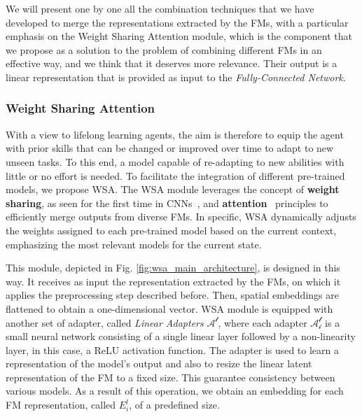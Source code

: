 We will present one by one all the combination techniques that we have developed to merge the representations extracted by the FMs, with a particular emphasis on the Weight Sharing Attention module, which is the component that we propose as a solution to the problem of combining different FMs in an effective way, and we think that it deserves more relevance.
Their output is a linear representation that is provided as input to the \textit{Fully-Connected Network}.

\subsubsection{Weight Sharing Attention}\label{subsubsec:wsa}
With a view to lifelong learning agents, the aim is therefore to equip the agent with prior skills that can be changed or improved over time to adapt to new unseen tasks.
To this end, a model capable of re-adapting to new abilities with little or no effort is needed.
To facilitate the integration of different pre-trained models, we propose WSA\@.
The WSA module leverages the concept of \textbf{weight sharing}, as seen for the first time in CNNs~\citep{fukushima1980neocognitron}, and \textbf{attention}~\citep{vaswani2017attention} principles to efficiently merge outputs from diverse FMs.
In specific, WSA dynamically adjusts the weights assigned to each pre-trained model based on the current context, emphasizing the most relevant models for the current state.

This module, depicted in Fig. \ref{fig:wsa_main_architecture}, is designed in this way.
It receives as input the representation extracted by the FMs, on which it applies the preprocessing step described before.
Then, spatial embeddings are flattened to obtain a one-dimensional vector.
WSA module is equipped with another set of adapter, called \textit{Linear Adapters} $\mathcal{A^{l}}$, where each adapter $\mathcal{A^{l}_i}$ is a small neural network consisting of a single linear layer followed by a non-linearity layer, in this case, a ReLU activation function.
The adapter is used to learn a representation of the model's output and also to resize the linear latent representation of the FM to a fixed size.
This guarantee consistency between various models.
As a result of this operation, we obtain an embedding for each FM representation, called $E^{l}_i$, of a predefined size.


